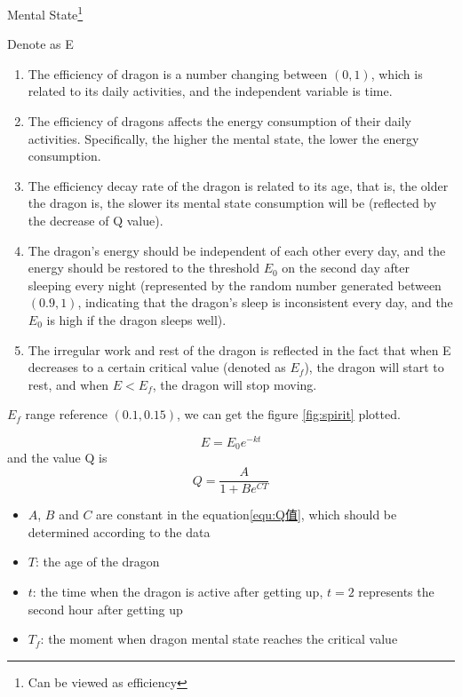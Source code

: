 \begin{defn}{Mental State\footnote{Can be viewed as efficiency}}
\end{defn}
Denote as E
\begin{enumerate}[(1)]
    \item The efficiency of dragon is a number changing between $(0,1)$, which is related to its daily activities, and the independent variable is time.
    \item The efficiency of dragons affects the energy consumption of their daily activities. Specifically, the higher the mental state, the lower the energy consumption.
    \item The efficiency decay rate of the dragon is related to its age, that is, the older the dragon is, the slower its mental state consumption will be (reflected by the decrease of Q value).
    \item The dragon's energy should be independent of each other every day, and the energy should be restored to the threshold $E_0$ on the second day after sleeping every night (represented by the random number generated between $(0.9,1)$, indicating that the dragon's sleep is inconsistent every day, and the $E_0$ is high if the dragon sleeps well).
    \item The irregular work and rest of the dragon is reflected in the fact that when E decreases to a certain critical value (denoted as $E_f$), the dragon will start to rest, and when $E<E_f$, the dragon will stop moving.
\end{enumerate}

$E_f$ range reference $(0.1,0.15)$, we can get the figure \ref{fig:spirit} plotted.

    \begin{equation}\label{equ:精力E}
    E=E_0e^{-kt}
    \end{equation}
and the value Q is
    \begin{equation}\label{equ:Q值}
    Q=\frac{A}{1+Be^{CT}}
    \end{equation}
    \begin{itemize}
        \item $A$, $B$ and $C$ are constant in the equation\eqref{equ:Q值}, which should be determined according to the data
        \item $T$: the age of the dragon
        \item $t$: the time when the dragon is active after getting up, $t=2$ represents the second hour after getting up
        \item $T_f$: the moment when dragon mental state reaches the critical value
     \end{itemize}
     
